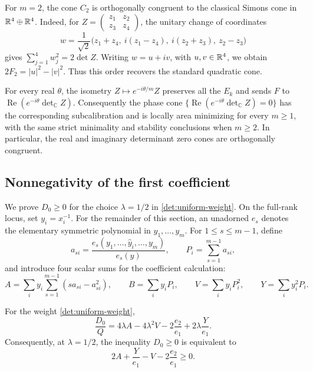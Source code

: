\begin{remark}\label{det:low-orders-phase}
For \(m=2\), the cone \(C_2\) is orthogonally congruent to the
classical Simons cone in \(\mathbb R^4\oplus\mathbb R^4\).
Indeed, for \(Z=\left(\begin{smallmatrix}z_1&z_2\\z_3&z_4\end{smallmatrix}\right)\),
the unitary change of coordinates
\[
 w=\frac1{\sqrt2}\bigl(z_1+z_4,\ i(z_1-z_4),\ i(z_2+z_3),\ z_2-z_3\bigr)
\]
gives \(\sum_{j=1}^4w_j^2=2\det Z\).
Writing \(w=u+iv\), with \(u,v\in\mathbb R^4\), we obtain
\(2F_2=|u|^2-|v|^2\). Thus this order recovers the standard
quadratic cone.

For every real $\theta$, the isometry $Z\mapsto e^{-i\theta/m}Z$
preserves all the $E_k$ and sends $F$ to
$\operatorname{Re}(e^{-i\theta}\det_{\mathbb C}Z)$.
Consequently the phase cone
$\{\operatorname{Re}(e^{-i\theta}\det_{\mathbb C}Z)=0\}$ has the
corresponding subcalibration and is locally area minimizing for every
$m\geq1$, with the same strict minimality and stability conclusions
when $m\geq2$. In particular, the real and imaginary determinant zero cones
are orthogonally congruent.
\end{remark}

\subsection{Nonnegativity of the first coefficient}
\label{det:first-section}

We prove $D_0\geq0$ for the choice $\lambda=1/2$ in
\eqref{det:uniform-weight}.  On the full-rank locus, set
$y_i=x_i^{-1}$. For the remainder of this section, an unadorned
$e_s$ denotes the elementary symmetric polynomial in $y_1,\ldots,y_m$.
For $1\leq s\leq m-1$, define
\begin{equation}\label{det:a-variables}
 a_{si}=\frac{e_s(y_1,\ldots,\widehat y_i,\ldots,y_m)}{e_s(y)},
 \qquad P_i=\sum_{s=1}^{m-1} a_{si},
\end{equation}
and introduce four scalar sums for the coefficient calculation:
\begin{equation}\label{det:A-V-Y}
 A=\sum_i y_i\sum_{s=1}^{m-1}(s a_{si}-a_{si}^2),\qquad
 B=\sum_i y_iP_i,\qquad
 V=\sum_i y_iP_i^2,\qquad Y=\sum_i y_i^2P_i.
\end{equation}

\begin{lemma}\label{det:first-reduction}
For the weight \eqref{det:uniform-weight},
\begin{equation}\label{det:first-reduction-equation}
 \frac{D_0}{Q}
 =4\lambda A-4\lambda^2V
       -2\frac{e_2}{e_1}+2\lambda\frac{Y}{e_1}.
\end{equation}
Consequently, at $\lambda=1/2$, the inequality $D_0\geq0$ is equivalent
to
\begin{equation}\label{det:first-homogeneous}
 2A+\frac{Y}{e_1}-V-2\frac{e_2}{e_1}\geq0.
\end{equation}
\end{lemma}

